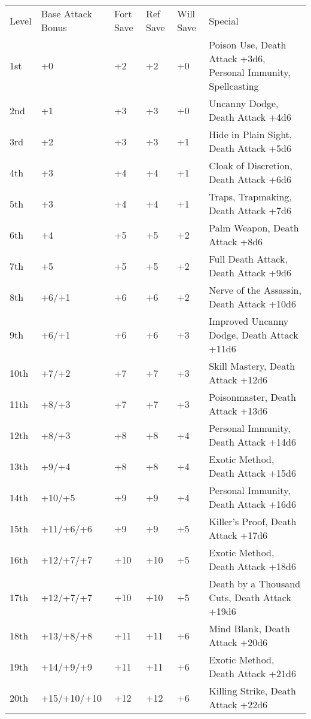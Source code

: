\documentclass[10pt]{article}
\begin{document}
\begin{table}[htb]
\begin{small}
\begin{tabular}{lp{1.9cm}p{0.7cm}p{0.7cm}p{0.7cm}l}
Level  &Base Attack Bonus &Fort Save &Ref Save &Will Save &Special\\
1st &+0 &+2 &+2 &+0 &Poison Use, Death Attack +3d6, Personal Immunity, Spellcasting\\
2nd &+1 &+3 &+3 &+0 &Uncanny Dodge, Death Attack +4d6\\
3rd &+2 &+3 &+3 &+1 &Hide in Plain Sight, Death Attack +5d6\\
4th &+3 &+4 &+4 &+1 &Cloak of Discretion, Death Attack +6d6\\
5th &+3 &+4 &+4 &+1 &Traps, Trapmaking, Death Attack +7d6\\
6th &+4 &+5 &+5 &+2 &Palm Weapon, Death Attack +8d6\\
7th &+5 &+5 &+5 &+2 &Full Death Attack, Death Attack +9d6\\
8th &+6/+1 &+6 &+6 &+2 &Nerve of the Assassin, Death Attack +10d6\\
9th &+6/+1 &+6 &+6 &+3 &Improved Uncanny Dodge, Death Attack +11d6\\
10th &+7/+2 &+7 &+7 &+3 &Skill Mastery, Death Attack +12d6\\
11th &+8/+3 &+7 &+7 &+3 &Poisonmaster, Death Attack +13d6\\
12th &+8/+3 &+8 &+8 &+4 &Personal Immunity, Death Attack +14d6\\
13th &+9/+4 &+8 &+8 &+4 &Exotic Method, Death Attack +15d6\\
14th &+10/+5 &+9 &+9 &+4 &Personal Immunity, Death Attack +16d6\\
15th &+11/+6/+6 &+9 &+9 &+5 &Killer's Proof, Death Attack +17d6\\
16th &+12/+7/+7 &+10 &+10 &+5 &Exotic Method, Death Attack +18d6\\
17th &+12/+7/+7 &+10 &+10 &+5 &Death by a Thousand Cuts, Death Attack +19d6\\
18th &+13/+8/+8 &+11 &+11 &+6 &Mind Blank, Death Attack +20d6\\
19th &+14/+9/+9 &+11 &+11 &+6 &Exotic Method, Death Attack +21d6\\
20th &+15/+10/+10 &+12 &+12 &+6 &Killing Strike, Death Attack +22d6\\
\end{tabular}
\end{small}
\end{table}
\end{document}
